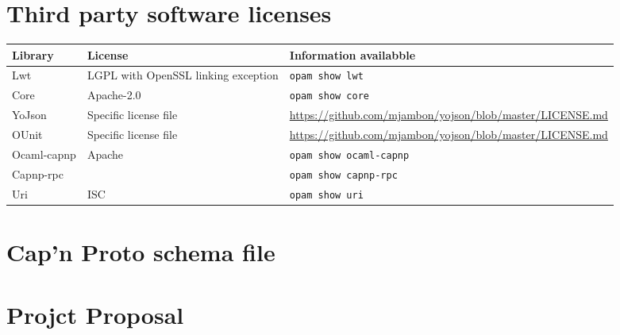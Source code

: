 \documentclass[12pt,twoside,notitlepage]{report}
\begin{document}


\newpage



\newpage




\newpage



\cleardoublepage




\newpage


\appendix

\chapter{Third party software licenses}
\label{appendix:licenses}
\begin{table}[h]
\centering
\begin{tabular}{ l  | p{3.0cm}| p{7.0cm} } 
   \textbf{Library} & \textbf{License} & \textbf{Information availabble} \\ \hline
    Lwt & LGPL with OpenSSL linking exception & \texttt{opam show lwt} \\ \hline
    Core & Apache-2.0 & \texttt{opam show core} \\ \hline
    YoJson & Specific license file & \url{https://github.com/mjambon/yojson/blob/master/LICENSE.md} \\ \hline
    OUnit & Specific license file & \url{https://github.com/mjambon/yojson/blob/master/LICENSE.md} \\ \hline
    Ocaml-capnp & Apache &  \texttt{opam show ocaml-capnp} \\
    Capnp-rpc & & \texttt{opam show capnp-rpc} \\ \hline
    Uri & ISC & \texttt{opam show uri}
\end{tabular}
\end{table}

\chapter{Cap'n Proto schema file}
\label{appendix:schema}
%



\chapter{Projct Proposal}
\label{appendix:proposal}

\end{document}

